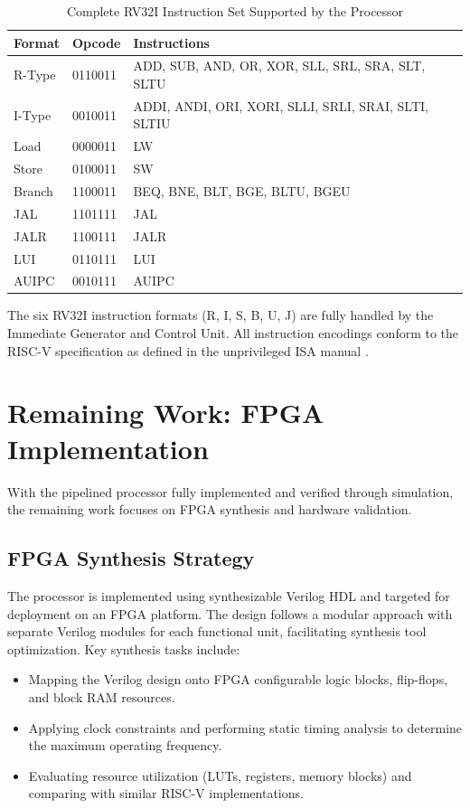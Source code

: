 \documentclass[12pt,a4paper]{report}
\begin{document}
\begin{table}[H]
\centering
\caption{Complete RV32I Instruction Set Supported by the Processor}
\label{tab:instructions}
\begin{tabular}{L{2.2cm} L{2.0cm} L{7.2cm}}
    \toprule
    \textbf{Format} & \textbf{Opcode} & \textbf{Instructions} \\
    \midrule
    R-Type  & 0110011 & ADD, SUB, AND, OR, XOR, SLL, SRL, SRA, SLT, SLTU \\
    I-Type  & 0010011 & ADDI, ANDI, ORI, XORI, SLLI, SRLI, SRAI, SLTI, SLTIU \\
    Load    & 0000011 & LW \\
    Store   & 0100011 & SW \\
    Branch  & 1100011 & BEQ, BNE, BLT, BGE, BLTU, BGEU \\
    JAL     & 1101111 & JAL \\
    JALR    & 1100111 & JALR \\
    LUI     & 0110111 & LUI \\
    AUIPC   & 0010111 & AUIPC \\
    \bottomrule
\end{tabular}
\end{table}

The six RV32I instruction formats (R, I, S, B, U, J) are fully handled by the
Immediate Generator and Control Unit. All instruction encodings conform to the RISC-V
specification as defined in the unprivileged ISA manual \cite{riscv}.


\chapter{Remaining Work: FPGA Implementation}

With the pipelined processor fully implemented and verified through simulation, the
remaining work focuses on FPGA synthesis and hardware validation.

\section{FPGA Synthesis Strategy}
The processor is implemented using synthesizable Verilog HDL and targeted for
deployment on an FPGA platform. The design follows a modular approach with separate
Verilog modules for each functional unit, facilitating synthesis tool optimization.
Key synthesis tasks include:

\begin{itemize}
    \item Mapping the Verilog design onto FPGA configurable logic blocks, flip-flops,
          and block RAM resources.
    \item Applying clock constraints and performing static timing analysis to
          determine the maximum operating frequency.
    \item Evaluating resource utilization (LUTs, registers, memory blocks) and
          comparing with similar RISC-V implementations.
\end{itemize}
\end{document}
